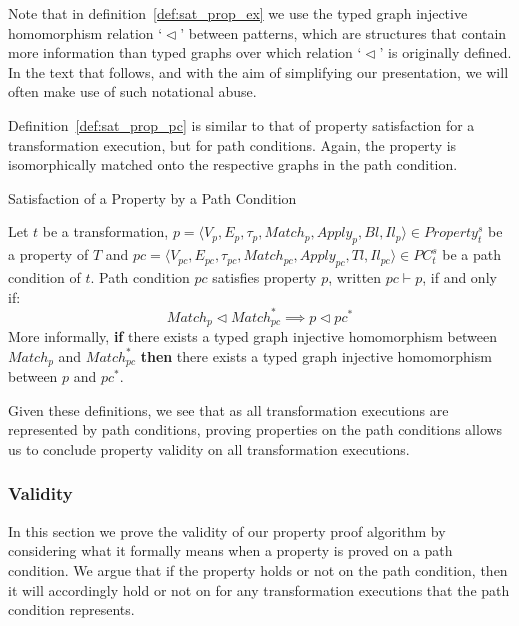 Note that in definition~\ref{def:sat_prop_ex} we use the typed graph injective
homomorphism relation `$\vartriangleleft$' between patterns, which are
structures that contain more information than typed graphs over which
relation `$\vartriangleleft$' is originally defined. In the text that follows, and with the aim of
simplifying our presentation, we will often make use of such notational abuse.


Definition~\ref{def:sat_prop_pc} is similar to that of property satisfaction for a transformation execution, but for path conditions. Again, the property is isomorphically matched onto the respective graphs in the path condition.

\begin{definition}{Satisfaction of a Property by a Path Condition}
\label{def:sat_prop_pc}

Let $t$ be a transformation, $p = \langle
V_p,E_p,\tau_p,Match_p,Apply_p,Bl,Il_p\rangle \in Property^{s}_{t}$ be a property of $T$ and $pc =
\langle V_{pc},E_{pc},\tau_{pc},Match_{pc},Apply_{pc},Tl,Il_{pc}\rangle \in PC^{s}_{t}$ be a path condition of
$t$. Path condition $pc$ satisfies property $p$, written $pc \vdash p$, if and only if:
 $$Match_p \vartriangleleft Match^{*}_{pc} \implies p \vartriangleleft pc^*$$
More informally, \textbf{if} there exists a typed graph injective homomorphism between $Match_p$ and $Match^{*}_{pc}$
\textbf{then} there exists a typed graph injective homomorphism between $p$ and $pc^*$.

\end{definition}

Given these definitions, we see that as all transformation executions are represented by path conditions, proving properties on the path conditions allows us to conclude property validity on all transformation executions.


\subsubsection{Validity}

In this section we prove the validity of our property proof algorithm by considering what it
formally means when a property is proved on a path condition. We argue that if
the property holds or not on the path condition, then it will accordingly hold
or not on for any transformation executions that the path condition represents.


